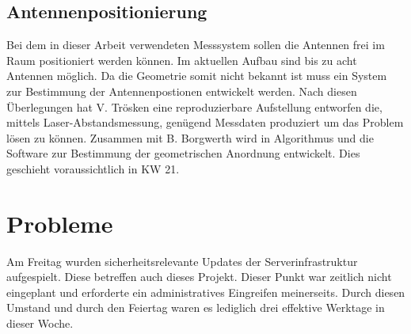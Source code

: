 \documentclass[a4paper,12pt,fleqn]{article}
\begin{document}
\subsection{Antennenpositionierung}
Bei dem in dieser Arbeit verwendeten Messsystem sollen die Antennen frei im Raum positioniert werden können. Im aktuellen Aufbau sind bis zu acht Antennen möglich. Da die Geometrie somit nicht bekannt ist muss ein System zur Bestimmung der Antennenpostionen entwickelt werden. Nach diesen Überlegungen hat V. Trösken eine reproduzierbare Aufstellung entworfen die, mittels Laser-Abstandsmessung, genügend Messdaten produziert um das Problem lösen zu können. Zusammen mit B. Borgwerth wird in Algorithmus und die Software zur Bestimmung der geometrischen Anordnung entwickelt. Dies geschieht voraussichtlich in KW 21.

\section[Probleme]{Probleme}
Am Freitag wurden sicherheitsrelevante Updates der Serverinfrastruktur aufgespielt. Diese betreffen auch dieses Projekt. Dieser Punkt war zeitlich nicht eingeplant und erforderte ein administratives Eingreifen meinerseits. Durch diesen Umstand und durch den Feiertag waren es lediglich drei effektive Werktage in dieser Woche.



\newpage


\end{document}
